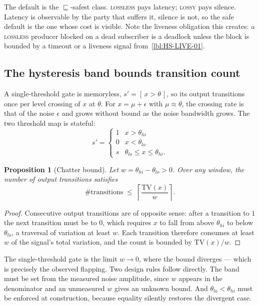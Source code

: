 \documentclass[11pt]{article}
\newtheorem{prop}{Proposition}[section]
\begin{document}
The default is the $\sqsubseteq$-safest class. \textsc{lossless} pays latency;
\textsc{lossy} pays silence. Latency is observable by the party that suffers it,
silence is not, so the safe default is the one whose cost is visible. Note the
liveness obligation this creates: a \textsc{lossless} producer blocked on a
dead subscriber is a deadlock unless the block is bounded by a timeout or a
liveness signal from~\ref{lbl:HS-LIVE-01}.

\subsection{The hysteresis band bounds transition count}
\label{lbl:HS-GATE-04}

A single-threshold gate is memoryless, $s' = [\,x > \theta\,]$, so its output
transitions once per level crossing of $x$ at $\theta$. For $x = \mu +
\epsilon$ with $\mu \approx \theta$, the crossing rate is that of the noise
$\epsilon$ and grows without bound as the noise bandwidth grows. The two
threshold map is stateful:
\begin{equation}
s' = \begin{cases}
1 & x > \theta_{hi} \\
0 & x < \theta_{lo} \\
s & \theta_{lo} \le x \le \theta_{hi}.
\end{cases}
\end{equation}

\begin{prop}[Chatter bound]
Let $w = \theta_{hi} - \theta_{lo} > 0$. Over any window, the number of output
transitions satisfies
\begin{equation}
\#\mathrm{transitions} \;\le\; \left\lceil \frac{\mathrm{TV}(x)}{w} \right\rceil .
\end{equation}
\end{prop}

\begin{proof}
Consecutive output transitions are of opposite sense: after a transition to $1$
the next transition must be to $0$, which requires $x$ to fall from above
$\theta_{hi}$ to below $\theta_{lo}$, a traversal of variation at least $w$.
Each transition therefore consumes at least $w$ of the signal's total variation,
and the count is bounded by $\mathrm{TV}(x)/w$.
\end{proof}

The single-threshold gate is the limit $w \to 0$, where the bound diverges ---
which is precisely the observed flapping. Two design rules follow directly. The
band must be set from the measured noise amplitude, since $w$ appears in the
denominator and an unmeasured $w$ gives an unknown bound. And $\theta_{lo} <
\theta_{hi}$ must be enforced at construction, because equality silently
restores the divergent case.
\end{document}
